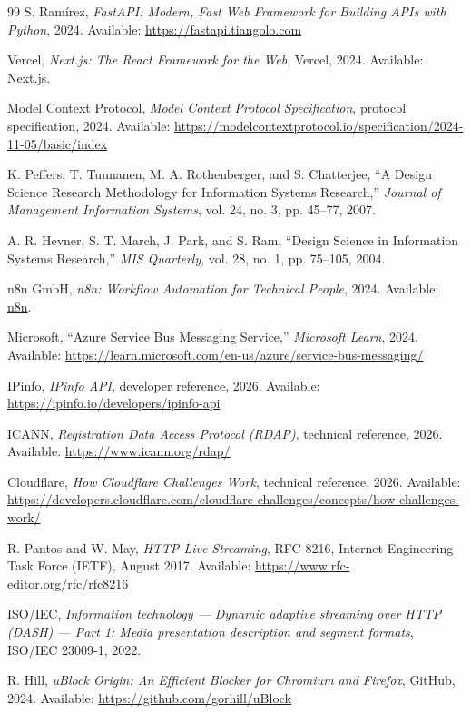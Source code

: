 \documentclass[12pt,a4paper,twoside]{report}
\begin{document}
\begin{thebibliography}{99}
S. Ram\'irez,
\emph{FastAPI: Modern, Fast Web Framework for Building APIs with Python},
2024. Available: \url{https://fastapi.tiangolo.com}

Vercel,
\emph{Next.js: The React Framework for the Web},
Vercel, 2024.
Available: \href{https://nextjs.org/docs}{Next.js}.

Model Context Protocol,
\emph{Model Context Protocol Specification},
protocol specification, 2024.
Available: \url{https://modelcontextprotocol.io/specification/2024-11-05/basic/index}

K. Peffers, T. Tuunanen, M. A. Rothenberger, and S. Chatterjee,
``A Design Science Research Methodology for Information Systems Research,''
\emph{Journal of Management Information Systems}, vol. 24, no. 3, pp. 45--77,
2007.

A. R. Hevner, S. T. March, J. Park, and S. Ram,
``Design Science in Information Systems Research,''
\emph{MIS Quarterly}, vol. 28, no. 1, pp. 75--105, 2004.

n8n GmbH,
\emph{n8n: Workflow Automation for Technical People},
2024.
Available: \href{https://docs.n8n.io}{n8n}.


Microsoft,
``Azure Service Bus Messaging Service,''
\emph{Microsoft Learn}, 2024.
Available: \url{https://learn.microsoft.com/en-us/azure/service-bus-messaging/}

IPinfo,
\emph{IPinfo API},
developer reference, 2026.
Available: \url{https://ipinfo.io/developers/ipinfo-api}

ICANN,
\emph{Registration Data Access Protocol (RDAP)},
technical reference, 2026.
Available: \url{https://www.icann.org/rdap/}

Cloudflare,
\emph{How Cloudflare Challenges Work},
technical reference, 2026.
Available: \url{https://developers.cloudflare.com/cloudflare-challenges/concepts/how-challenges-work/}


R. Pantos and W. May,
\emph{HTTP Live Streaming}, RFC 8216,
Internet Engineering Task Force (IETF), August 2017.
Available: \url{https://www.rfc-editor.org/rfc/rfc8216}

ISO/IEC,
\emph{Information technology --- Dynamic adaptive streaming over HTTP (DASH) --- Part 1:
Media presentation description and segment formats}, ISO/IEC 23009-1,
2022.


R. Hill,
\emph{uBlock Origin: An Efficient Blocker for Chromium and Firefox},
GitHub, 2024.
Available: \url{https://github.com/gorhill/uBlock}

\end{thebibliography}
\endgroup
\end{document}
